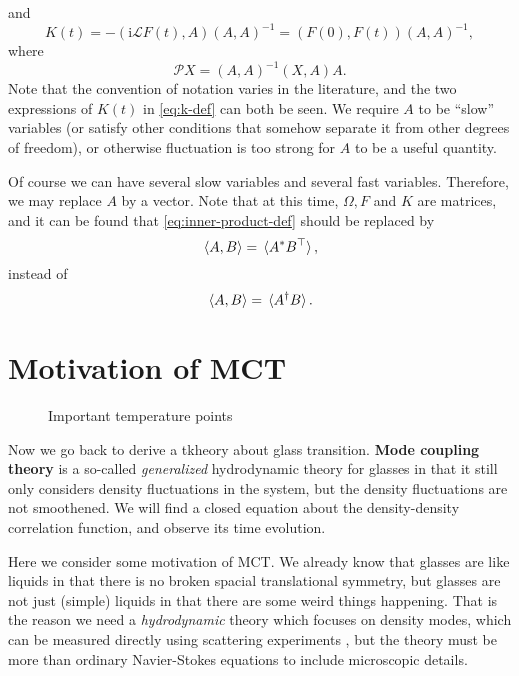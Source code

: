 \documentclass[hyperref, a4paper]{article}
\newcommand*{\ii}{\mathrm{i}}
\newcommand*{\concept}[1]{{\textbf{#1}}}
\begin{document}
and 
\begin{equation}
    K(t)=- (\ii \mathcal{L} F(t),A)(A,A)^{-1} = (F(0), F(t)) (A,A)^{-1},
    \label{eq:k-def}
\end{equation}
where 
\begin{equation}
    \mathcal{P} X=(A,A)^{-1}(X,A)A.
\end{equation}
Note that the convention of notation varies in the literature, and the two expressions of $K(t)$ in \eqref{eq:k-def}
can both be seen. We require $A$ to be ``slow'' variables (or satisfy other conditions that somehow separate it 
from other degrees of freedom), or otherwise fluctuation is too strong for $A$ to be a useful quantity.

Of course we can have several slow variables and several fast variables. Therefore, we may replace $A$ by a vector. 
Note that at this time, $\Omega, F$ and $K$ are matrices, and it can be found that \eqref{eq:inner-product-def}
should be replaced by 
\begin{equation}
    \expval*{A, B} = \expval*{A^* B^\top},
\end{equation} 
instead of 
\[
    \expval*{A, B} = \expval*{A^\dagger B}.
\]

\section{Motivation of MCT}

\begin{figure}
    \centering
    
    \caption{Important temperature points}
\end{figure}

Now we go back to derive a tkheory about glass transition. \concept{Mode coupling theory} is a so-called 
\emph{generalized} hydrodynamic theory for glasses \cite{RevModPhys.76.785} in that it still only considers 
density fluctuations in the system, but the density fluctuations are not smoothened. We will find a closed 
equation about the density-density correlation function, and observe its time evolution.

Here we consider some motivation of MCT. We already know that glasses are like liquids in that there is no 
broken spacial translational symmetry, but glasses are not just (simple) liquids in that there are some 
weird things happening. That is the reason we need a \emph{hydrodynamic} theory which focuses on density 
modes, which can be measured directly using scattering experiments \cite{mct2005}, but the theory must
be more than ordinary Navier-Stokes equations to include microscopic details.  
\end{document}
